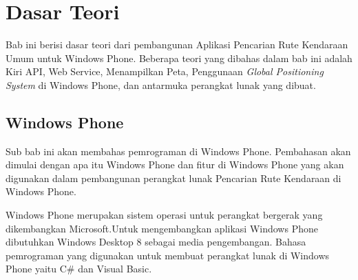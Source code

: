 \chapter{Dasar Teori}
\label{chap:teori}
Bab ini berisi dasar teori dari pembangunan Aplikasi Pencarian Rute Kendaraan Umum untuk Windows Phone. Beberapa teori yang dibahas dalam bab ini  adalah Kiri API, Web Service, Menampilkan Peta, Penggunaan \textit{Global Positioning System} di Windows Phone, dan antarmuka perangkat lunak yang dibuat. 

\section{Windows Phone}
\label{sec:Windows Phone}
\hspace{0.5cm} Sub bab ini akan membahas pemrograman di Windows Phone. Pembahasan akan dimulai dengan apa itu Windows Phone dan fitur di Windows Phone yang akan digunakan dalam pembangunan perangkat lunak Pencarian Rute Kendaraan di Windows Phone. 

Windows Phone merupakan sistem operasi untuk perangkat bergerak yang dikembangkan Microsoft.\footnotemark[1] Untuk mengembangkan aplikasi Windows Phone dibutuhkan Windows Desktop 8 sebagai media pengembangan. Bahasa pemrograman yang digunakan untuk membuat perangkat lunak di Windows Phone yaitu C\# dan Visual Basic.  

